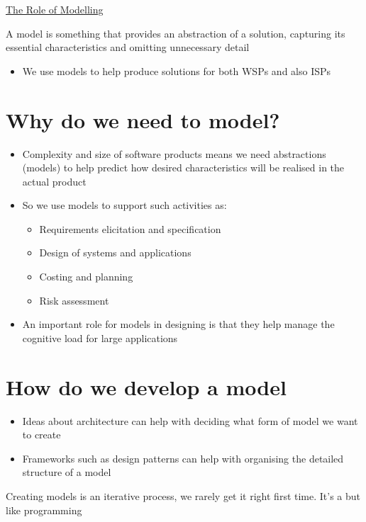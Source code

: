 \documentclass{article}[18pt]
\begin{document}
\begin{center}
\underline{\huge The Role of Modelling}
\end{center}
\begin{defin}[Model]
	A model is something that provides an abstraction of a solution, capturing its essential characteristics and omitting unnecessary detail
\end{defin}
\begin{itemize}
	\item We use models to help produce solutions for both WSPs and also ISPs
\end{itemize}
\section{Why do we need to model?}
\begin{itemize}
	\item Complexity and size of software products means we need abstractions (models) to help predict how desired characteristics will be realised in the actual product
	\item So we use models to support such activities as:
	\begin{itemize}
		\item Requirements elicitation and specification
		\item Design of systems and applications
		\item Costing and planning
		\item Risk assessment
	\end{itemize}
	\item An important role for models in designing is that they help manage the cognitive load for large applications
\end{itemize}
\section{How do we develop a model}
\begin{itemize}
	\item Ideas about architecture can help with deciding what form of model we want to create
	\item Frameworks such as design patterns can help with organising the detailed structure of a model
\end{itemize}
\begin{important}[Models]
Creating models is an iterative process, we rarely get it right first time. It's a but like programming
\end{important}
\end{document}
